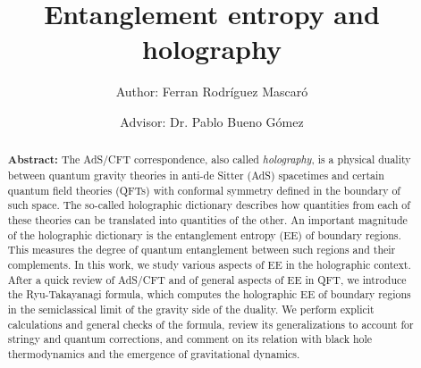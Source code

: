 \documentclass[twocolumn]{revtex4}
\begin{document}
\pagestyle{fancy}


\title{Entanglement entropy and holography}
\author{Author: Ferran Rodríguez Mascaró}
\author{Advisor: Dr. Pablo Bueno Gómez}


\begin{abstract}
    {\bf Abstract:} The AdS/CFT correspondence, also called \emph{holography}, is a physical duality between quantum gravity theories in anti-de Sitter (AdS) spacetimes and certain quantum field theories (QFTs) with conformal symmetry defined in the boundary of such space. The so-called holographic dictionary describes how quantities from each of these theories can be translated into quantities of the other. An important magnitude of the holographic dictionary is the entanglement entropy (EE) of boundary regions. This measures the degree of quantum entanglement between such regions and their complements. In this work, we study various aspects of EE in the holographic context. After a quick review of AdS/CFT and of general aspects of EE in QFT, we introduce the Ryu-Takayanagi formula, which computes the holographic EE of boundary regions in the semiclassical limit of the gravity side of the duality. We perform explicit calculations and general checks of the formula, review its generalizations to account for stringy and quantum corrections, and comment on its relation with black hole thermodynamics and the emergence of gravitational dynamics.
\end{abstract}


\maketitle
\end{document}
